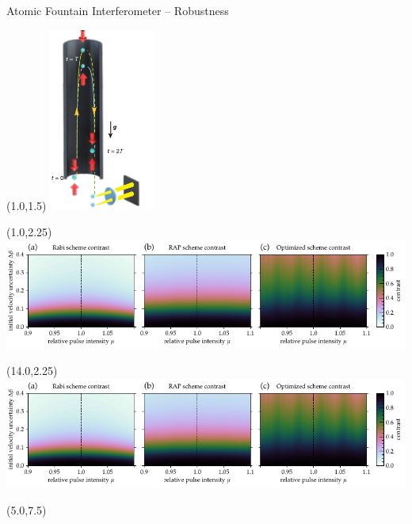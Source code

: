 \documentclass[compress, aspectratio=169,usepdftitle=false]{beamer}
\begin{document}
\begin{frame}{Atomic Fountain Interferometer -- Robustness}
  \begin{textblock}{3}(1.0,1.5)
    \includegraphics[height=6cm]{images/atomic_fountain.pdf}
  \end{textblock}
  \begin{textblock}{13}(1.0,2.25)
    \hfill\includegraphics[trim=0 0 9.2cm 0,clip]{images/afioct/fig4.pdf}
  \end{textblock}
  \begin{textblock}{1}(14.0,2.25)
    \includegraphics[trim=12.6cm 0 0 0,clip]{images/afioct/fig4.pdf} %
  \end{textblock}
  \begin{textblock}{10}(5.0,7.5)
  \end{textblock}
\end{frame}
\end{document}
